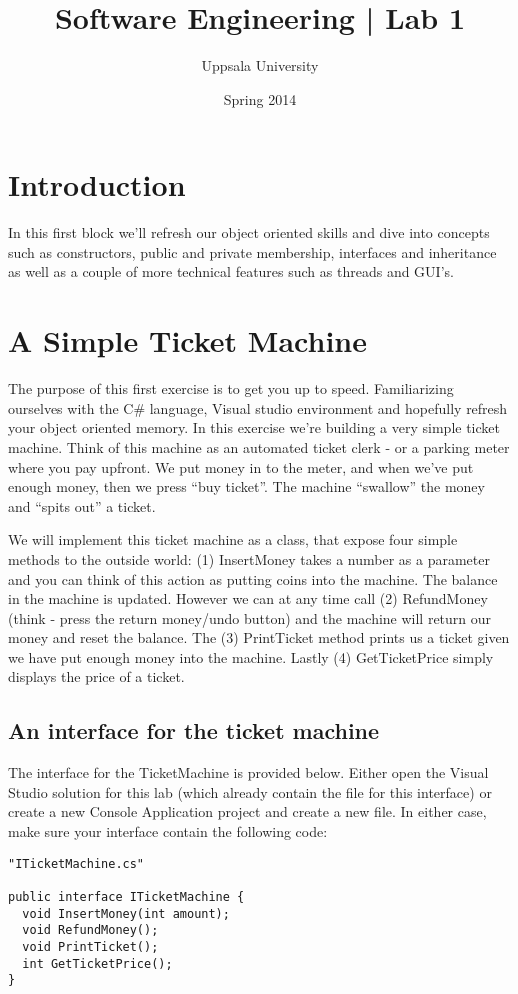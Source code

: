 \documentclass{article}
\begin{document}
  \title{ Software Engineering | Lab 1 }
  \author{ Uppsala University }
  \date{ Spring 2014 }
  \maketitle

  \lstset{language=[Sharp]C}







\section*{ Introduction }
In this first block we’ll refresh our object oriented skills and dive into concepts such as constructors, public and private membership, interfaces and inheritance as well as a couple of more technical features such as threads and GUI’s.










\pagebreak
\section{ A Simple Ticket Machine }
The purpose of this first exercise is to get you up to speed. Familiarizing ourselves with the C\# language, Visual studio environment and hopefully refresh your object oriented memory. In this exercise we’re building a very simple ticket machine. Think of this machine as an automated ticket clerk - or a parking meter where you pay upfront. We put money in to the meter, and when we’ve put enough money, then we press “buy ticket”. The machine “swallow” the money and “spits out” a ticket.

We will implement this ticket machine as a class, that expose four simple methods to the outside world: (1) InsertMoney takes a number as a parameter and you can think of this action as putting coins into the machine. The balance in the machine is updated. However we can at any time call (2) RefundMoney (think - press the return money/undo button) and the machine will return our money and reset the balance. The (3) PrintTicket method prints us a ticket given we have put enough money into the machine. Lastly (4) GetTicketPrice simply displays the price of a ticket.

\subsection{An interface for the ticket machine}
The interface for the TicketMachine is provided below. Either open the Visual Studio solution for this lab (which already contain the file for this interface) or create a new Console Application project and create a new file. In either case, make sure your interface contain the following code:
\begin{lstlisting}
"ITicketMachine.cs"

public interface ITicketMachine {
  void InsertMoney(int amount);
  void RefundMoney();
  void PrintTicket();
  int GetTicketPrice();
}
    \end{lstlisting}
\end{document}
